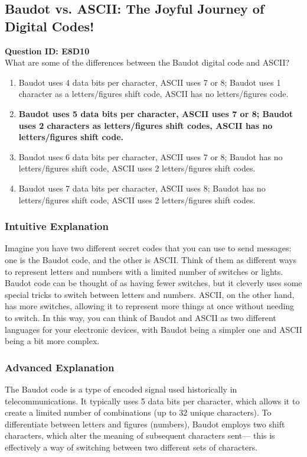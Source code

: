 \subsection{Baudot vs. ASCII: The Joyful Journey of Digital Codes!}

\begin{tcolorbox}
    \textbf{Question ID: E8D10} \\
    What are some of the differences between the Baudot digital code and ASCII? \\
    \begin{enumerate}[label=\Alph*.]
        \item Baudot uses 4 data bits per character, ASCII uses 7 or 8; Baudot uses 1 character as a letters/figures shift code, ASCII has no letters/figures code.
        \item \textbf{Baudot uses 5 data bits per character, ASCII uses 7 or 8; Baudot uses 2 characters as letters/figures shift codes, ASCII has no letters/figures shift code.}
        \item Baudot uses 6 data bits per character, ASCII uses 7 or 8; Baudot has no letters/figures shift code, ASCII uses 2 letters/figures shift codes.
        \item Baudot uses 7 data bits per character, ASCII uses 8; Baudot has no letters/figures shift code, ASCII uses 2 letters/figures shift codes.
    \end{enumerate}
\end{tcolorbox}

\subsubsection{Intuitive Explanation}
Imagine you have two different secret codes that you can use to send messages: one is the Baudot code, and the other is ASCII. Think of them as different ways to represent letters and numbers with a limited number of switches or lights. Baudot code can be thought of as having fewer switches, but it cleverly uses some special tricks to switch between letters and numbers. ASCII, on the other hand, has more switches, allowing it to represent more things at once without needing to switch. In this way, you can think of Baudot and ASCII as two different languages for your electronic devices, with Baudot being a simpler one and ASCII being a bit more complex.

\subsubsection{Advanced Explanation}
The Baudot code is a type of encoded signal used historically in telecommunications. It typically uses 5 data bits per character, which allows it to create a limited number of combinations (up to 32 unique characters). To differentiate between letters and figures (numbers), Baudot employs two shift characters, which alter the meaning of subsequent characters sent— this is effectively a way of switching between two different sets of characters.

